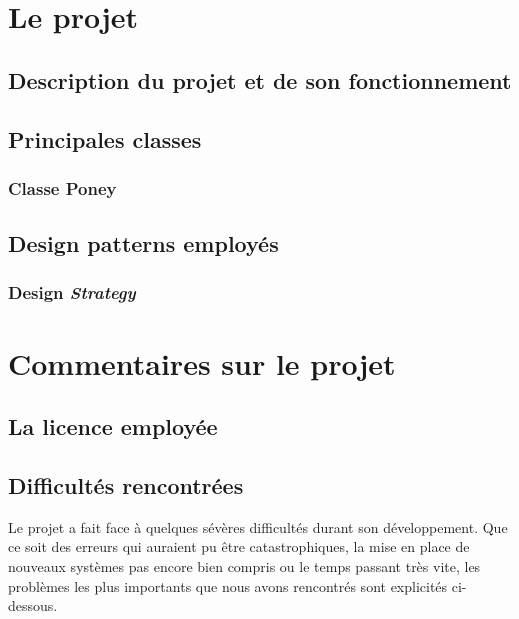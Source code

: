 \documentclass{article}
\newcommand{\pattern}{\emph}
\begin{document}
\section{Le projet}
    
    
    \subsection{Description du projet et de son fonctionnement}

    \subsection{Principales classes}

        \subsubsection{Classe Poney}

    \subsection{Design patterns employés}

        \subsubsection{Design \pattern{Strategy}}
        
\section{Commentaires sur le projet}

    \subsection{La licence employée}
    
    
    \subsection{Difficultés rencontrées}
    
    Le projet a fait face à quelques sévères difficultés durant son développement. Que ce soit des erreurs qui auraient pu être catastrophiques, la mise en place de nouveaux systèmes pas encore bien compris ou le temps passant très vite, les problèmes les plus importants que nous avons rencontrés sont explicités ci-dessous.
    
\end{document}
